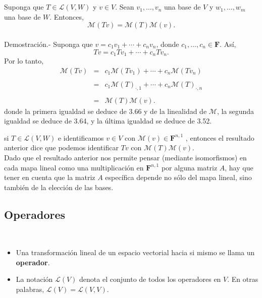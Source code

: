 \begin{myteo}\,\\\\
    Suponga que $T\in \mathcal{L}(V,W)$ y $v\in V$. Sean $v_1,\ldots,v_n$ una base de $V$ y $w_1,\ldots,w_m$ una base de $W$. Entonces,
    $$\mathcal{M}(Tv)=\mathcal{M}(T)\mathcal{M}(v).$$\\
	Demostración.-\; Suponga que $v=c_1v_1+\cdots+c_nv_n$, donde $c_1,\ldots,c_n\in \textbf{F}$. Así, 
	$$Tv=c_1Tv_1+\cdots+c_nTv_n.$$
	Por lo tanto,
	$$
	\begin{array}{rcl}
	    \mathcal{M}(Tv)&=&c_1\mathcal{M}(Tv_1)+\cdots+c_n\mathcal{M}(Tv_n)\\\\
			   &=& c_1\mathcal{M}(T)_{\cdot,1}+\cdots+c_n\mathcal{M}(T)_{\cdot,n}\\\\
			   &=& \mathcal{M}(T)\mathcal{M}(v).
	\end{array}
	$$
	donde la primera igualdad se deduce de 3.66 y de la linealidad de $\mathcal{M}$, la segunda igualdad se deduce de 3.64, y la última igualdad se deduce de 3.52.
\end{myteo}

si $T\in \mathcal{L}(V,W)$ e identificamos $v\in V$ con $\mathcal{M}(v)\in \textbf{F}^{n,1}$ , entonces el resultado anterior dice que podemos identificar $Tv$ con $\mathcal{M}(T)\mathcal{M}(v)$.\\

Dado que el resultado anterior nos permite pensar (mediante isomorfismos) en cada mapa lineal como una multiplicación en $\textbf{F}^{n,1}$ por alguna matriz $A$, hay que tener en cuenta que la matriz $A$ específica depende no sólo del mapa lineal, sino también de la elección de las bases. 


\subsection{Operadores}

\setcounter{myteo}{66}
\begin{mydef}\;\\
    \begin{itemize}
	\item Una transformación lineal de un espacio vectorial hacia si mismo se llama un \textbf{operador}.
	\item La notación $\mathcal{L}(V)$ denota el conjunto de todos los operadores en $V$. En otras palabras, $\mathcal{L}(V) = \mathcal{L}(V,V)$.
    \end{itemize}
\end{mydef}

